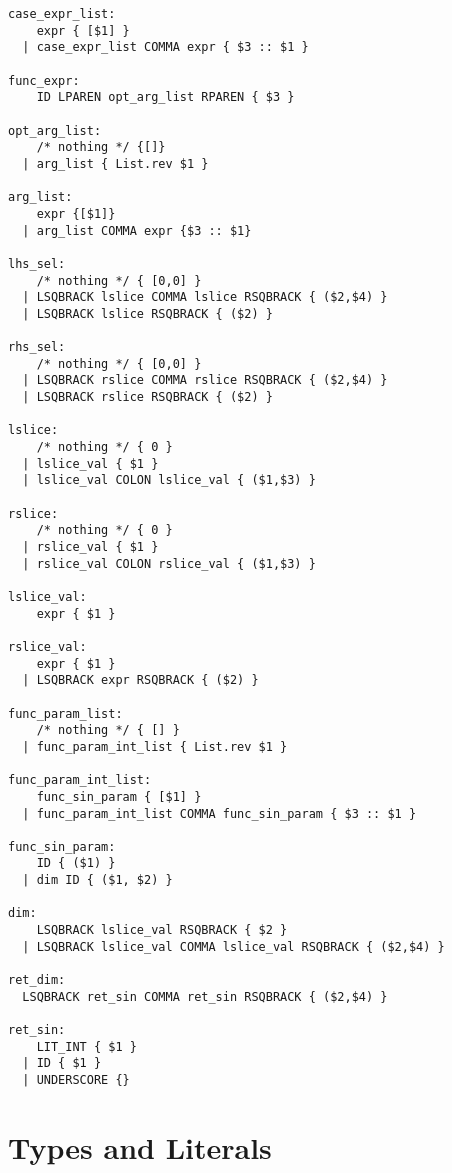 \documentclass[titlepage]{article}
\begin{document}
\begin{verbatim}
case_expr_list:
    expr { [$1] }
  | case_expr_list COMMA expr { $3 :: $1 }

func_expr:
    ID LPAREN opt_arg_list RPAREN { $3 }

opt_arg_list:
    /* nothing */ {[]}
  | arg_list { List.rev $1 }

arg_list:
    expr {[$1]}
  | arg_list COMMA expr {$3 :: $1}

lhs_sel:
    /* nothing */ { [0,0] }
  | LSQBRACK lslice COMMA lslice RSQBRACK { ($2,$4) }
  | LSQBRACK lslice RSQBRACK { ($2) }

rhs_sel:
    /* nothing */ { [0,0] }
  | LSQBRACK rslice COMMA rslice RSQBRACK { ($2,$4) }
  | LSQBRACK rslice RSQBRACK { ($2) }

lslice:
    /* nothing */ { 0 }
  | lslice_val { $1 }
  | lslice_val COLON lslice_val { ($1,$3) }

rslice:
    /* nothing */ { 0 }
  | rslice_val { $1 }
  | rslice_val COLON rslice_val { ($1,$3) }

lslice_val:
    expr { $1 }

rslice_val:
    expr { $1 }
  | LSQBRACK expr RSQBRACK { ($2) }

func_param_list:
    /* nothing */ { [] }
  | func_param_int_list { List.rev $1 }

func_param_int_list:
    func_sin_param { [$1] }
  | func_param_int_list COMMA func_sin_param { $3 :: $1 }

func_sin_param:
    ID { ($1) }
  | dim ID { ($1, $2) }

dim:
    LSQBRACK lslice_val RSQBRACK { $2 }
  | LSQBRACK lslice_val COMMA lslice_val RSQBRACK { ($2,$4) }

ret_dim:
  LSQBRACK ret_sin COMMA ret_sin RSQBRACK { ($2,$4) }

ret_sin:
    LIT_INT { $1 }
  | ID { $1 }
  | UNDERSCORE {}
\end{verbatim}
\section{Types and Literals}
\end{document}

